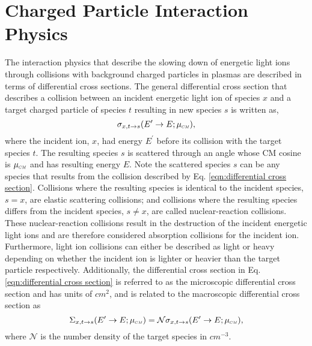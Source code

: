 \documentclass[../main.tex]{subfiles}
\begin{document}
\chapter{Charged Particle Interaction Physics}
The interaction physics that describe the slowing down of energetic light ions through collisions with background charged particles in plasmas are described in terms of differential cross sections. The general differential cross section that describes a collision between an incident energetic light ion of species $x$ and a target charged particle of species $t$ resulting in new species $s$ is written as,
\begin{equation} \label{eqn:differential cross section}
    \sigma_{x,t \rightarrow s}(E^{\prime} \rightarrow E; \mucm),
\end{equation}
where the incident ion, $x$, had energy $E^{\prime}$ before its collision with the target species $t$. The resulting species $s$ is scattered through an angle whose CM cosine is $\mucm$ and has resulting energy $E$. Note the scattered species $s$ can be any species that results from the collision described by Eq. \eqref{eqn:differential cross section}. Collisions where the resulting species is identical to the incident species, $s = x$, are elastic scattering collisions; and collisions where the resulting species differs from the incident species, $s \neq x$, are called nuclear-reaction collisions. These nuclear-reaction collisions result in the destruction of the incident energetic light ions and are therefore considered absorption collisions for the incident ion. Furthermore, light ion collisions can either be described as light or heavy depending on whether the incident ion is lighter or heavier than the target particle respectively. Additionally, the differential cross section in Eq. \eqref{eqn:differential cross section} is referred to as the microscopic differential cross section and has units of $cm^{2}$, and is related to the macroscopic differential cross section as
\begin{equation}
    \Sigma_{x,t \rightarrow s}(E^{\prime} \rightarrow E; \mucm) = \mathcal{N} \sigma_{x,t \rightarrow s}(E^{\prime} \rightarrow E; \mucm),
\end{equation}
where $\mathcal{N}$ is the number density of the target species in $cm^{-3}$.
\end{document}
